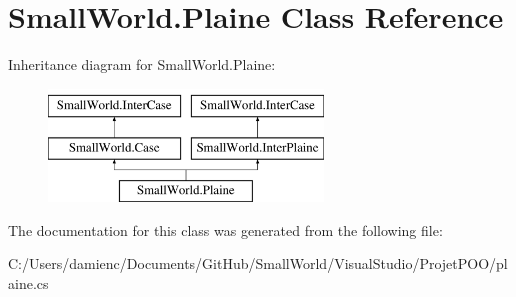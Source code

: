 \hypertarget{class_small_world_1_1_plaine}{\section{Small\-World.\-Plaine Class Reference}
\label{class_small_world_1_1_plaine}
}
Inheritance diagram for Small\-World.\-Plaine\-:\begin{figure}[H]
\begin{center}
\leavevmode
\includegraphics[height=3.000000cm]{class_small_world_1_1_plaine}
\end{center}
\end{figure}


The documentation for this class was generated from the following file\-:\begin{DoxyCompactItemize}
\item 
C\-:/\-Users/damienc/\-Documents/\-Git\-Hub/\-Small\-World/\-Visual\-Studio/\-Projet\-P\-O\-O/plaine.\-cs\end{DoxyCompactItemize}
